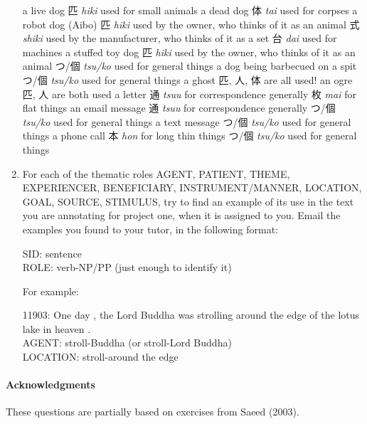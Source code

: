 \documentclass[a4paper]{article}
\newcommand{\jpn}[1]{\textit{#1}}
\begin{document}
\begin{enumerate}
  \begin{exe}
    \ex a live dog
    \trans 匹 \jpn{hiki} used for small animals
    \ex a dead dog
    \trans 体 \jpn{tai} used for corpses
    \ex a robot dog (Aibo)
    \trans  匹 \jpn{hiki} used by the owner, who thinks of it as an animal
    \trans 式 \jpn{shiki} used by the manufacturer, who thinks of it
    as a set
    \trans 台 \jpn{dai} used for machines
    \ex a stuffed toy dog
    \trans  匹 \jpn{hiki} used by the owner, who thinks of it as an animal
    \trans つ/個 \jpn{tsu/ko} used for general things
    \ex a dog being barbecued on a spit
    \trans つ/個 \jpn{tsu/ko} used for general things
    \ex a ghost
    \trans 匹, 人, 体 are all used!
    \ex an ogre
    \trans 匹, 人 are both used
    \ex a letter
    \trans 通 \jpn{tsuu} for correspondence generally
    \trans 枚 \jpn{mai} for flat things
    \ex an email message
    \trans 通 \jpn{tsuu} for correspondence generally
     \trans つ/個 \jpn{tsu/ko} used for general things
     \ex a text message
      \trans つ/個 \jpn{tsu/ko} used for general things
      \ex a phone call
        \trans 本 \jpn{hon} for long thin things
       \trans つ/個 \jpn{tsu/ko} used for general things
  \end{exe}

\item For each of the thematic roles AGENT, PATIENT, THEME,
  EXPERIENCER, BENEFICIARY, INSTRUMENT/MANNER, LOCATION, GOAL, SOURCE,
  STIMULUS, try to find an example of its use in the text you are
  annotating for project one, when it is assigned to you. 
  Email the examples you found to your tutor, in the following format:
  \begin{flushleft}
    SID: sentence \\
    ROLE: verb-NP/PP (just enough to identify it)
  \end{flushleft}
   For example:
  \begin{flushleft}
    11903: One day , the Lord Buddha was strolling around the edge of the lotus lake in heaven .\\
    AGENT: stroll-Buddha (or stroll-Lord Buddha)\\
    LOCATION: stroll-around the edge\\
  \end{flushleft}

\end{enumerate}




\vfill
\paragraph{Acknowledgments} These questions are partially
based on exercises from Saeed (2003).
\end{document}
